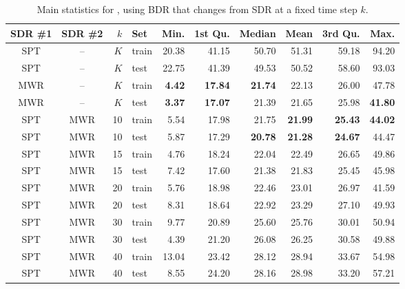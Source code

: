 \begin{table}[p]
\caption{Main statistics for  \namerho, using BDR that changes 
from SDR at a fixed time step $k$.}\label{tbl:BDR:stats} 
\centering
\begin{tabular}{ccrlrrrrrr}
  \toprule
  SDR \#1 & SDR \#2 & $k$ & Set & Min. & 1st Qu. & Median & Mean & 
    3rd Qu. & Max. \\ \midrule
  SPT & -- & $K$ & train & 20.38 & 41.15 & 50.70 & 51.31 & 59.18 & 94.20 \\ 
  SPT & -- & $K$ & test & 22.75 & 41.39 & 49.53 & 50.52 & 58.60 & 93.03 \\ 
  MWR & -- & $K$ & train & \textbf{4.42} & \textbf{17.84} & \textbf{21.74} & 
  22.13 & 26.00 & 47.78 \\ 
  MWR & -- & $K$ & test & \textbf{3.37} & \textbf{17.07} & 21.39 & 21.65 & 
  25.98 & \textbf{41.80} \\ 
  SPT & MWR & 10 & train & 5.54 & 17.98 & 21.75 & \textbf{21.99} & 
  \textbf{25.43} & \textbf{44.02} \\ 
  SPT & MWR & 10 & test & 5.87 & 17.29 & \textbf{20.78} & \textbf{21.28} & 
  \textbf{24.67} & 44.47 \\ 
  SPT & MWR & 15 & train & 4.76 & 18.24 & 22.04 & 22.49 & 26.65 & 49.86 \\ 
  SPT & MWR & 15 & test & 7.42 & 17.60 & 21.38 & 21.83 & 25.45 & 45.98 \\ 
  SPT & MWR & 20 & train & 5.76 & 18.98 & 22.46 & 23.01 & 26.97 & 41.59 \\ 
  SPT & MWR & 20 & test & 8.31 & 18.64 & 22.92 & 23.29 & 27.10 & 49.93 \\ 
  SPT & MWR & 30 & train & 9.77 & 20.89 & 25.60 & 25.76 & 30.01 & 50.94 \\ 
  SPT & MWR & 30 & test & 4.39 & 21.20 & 26.08 & 26.25 & 30.58 & 49.88 \\ 
  SPT & MWR & 40 & train & 13.04 & 23.42 & 28.12 & 28.94 & 33.67 & 54.98 \\ 
  SPT & MWR & 40 & test & 8.55 & 24.20 & 28.16 & 28.98 & 33.20 & 57.21 \\ 
  \bottomrule
\end{tabular}
\end{table}
